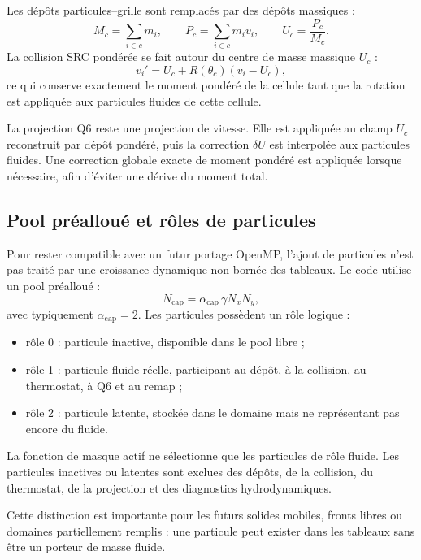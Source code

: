 \documentclass[11pt,a4paper]{article}
\begin{document}
Les dépôts particules--grille sont remplacés par des dépôts massiques :
\begin{equation}
  M_c = \sum_{i\in c} m_i,
  \qquad
  P_c = \sum_{i\in c} m_i v_i,
  \qquad
  U_c = \frac{P_c}{M_c}.
\end{equation}
La collision SRC pondérée se fait autour du centre de masse massique $U_c$ :
\begin{equation}
  v_i' = U_c + R(\theta_c)(v_i-U_c),
\end{equation}
ce qui conserve exactement le moment pondéré de la cellule tant que la rotation est appliquée aux particules fluides de cette cellule.

La projection Q6 reste une projection de vitesse. Elle est appliquée au champ $U_c$ reconstruit par dépôt pondéré, puis la correction $\delta U$ est interpolée aux particules fluides. Une correction globale exacte de moment pondéré est appliquée lorsque nécessaire, afin d'éviter une dérive du moment total.

\subsection{Pool préalloué et rôles de particules}

Pour rester compatible avec un futur portage OpenMP, l'ajout de particules n'est pas traité par une croissance dynamique non bornée des tableaux. Le code utilise un pool préalloué :
\begin{equation}
  N_{\mathrm{cap}} = \alpha_{\mathrm{cap}}\,\gamma N_xN_y,
\end{equation}
avec typiquement $\alpha_{\mathrm{cap}}=2$. Les particules possèdent un rôle logique :
\begin{itemize}
  \item rôle 0 : particule inactive, disponible dans le pool libre ;
  \item rôle 1 : particule fluide réelle, participant au dépôt, à la collision, au thermostat, à Q6 et au remap ;
  \item rôle 2 : particule latente, stockée dans le domaine mais ne représentant pas encore du fluide.
\end{itemize}
La fonction de masque actif ne sélectionne que les particules de rôle fluide. Les particules inactives ou latentes sont exclues des dépôts, de la collision, du thermostat, de la projection et des diagnostics hydrodynamiques.

Cette distinction est importante pour les futurs solides mobiles, fronts libres ou domaines partiellement remplis : une particule peut exister dans les tableaux sans être un porteur de masse fluide.
\end{document}
